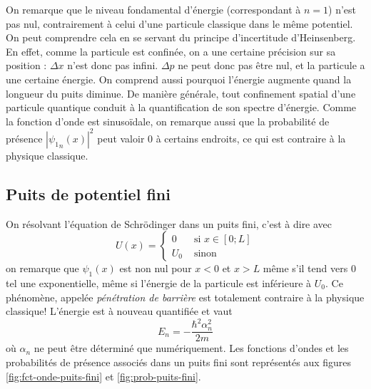 \begin{myrem}
	On remarque que le niveau fondamental d'énergie (correspondant
	à $n=1$) n'est pas nul, contrairement à celui d'une particule
	classique dans le même potentiel. On peut comprendre cela en
	se servant du principe d'incertitude d'Heinsenberg. En effet,
	comme la particule est confinée, on a une certaine précision
	sur sa position : $\Delta x$ n'est donc pas infini. $\Delta p$
	ne peut donc pas être nul, et la particule a une certaine énergie.
	On comprend aussi pourquoi l'énergie augmente quand la longueur
	du puits diminue. De manière générale, tout confinement
	spatial d'une particule quantique conduit à la quantification
	de son spectre d'énergie.
	Comme la fonction d'onde est sinusoïdale, on remarque aussi
	que la probabilité de présence $|{\psi_1}_n(x)|^2$ peut valoir
	0 à certains endroits, ce qui est contraire à la physique
	classique.
\end{myrem}

\subsection{Puits de potentiel fini}
On résolvant l'équation de Schrödinger dans un puits
fini, c'est à dire avec
\[ U(x) = \left\{
  \begin{aligned}
    0 & \text{ si } x \in [0; L]\\
    U_0 & \text{ sinon}
  \end{aligned}
\right. \]
on remarque que $\psi_1(x)$ est non nul pour $x < 0$ et $x > L$
même s'il tend vers 0 tel une exponentielle, même si l'énergie de
la particule est inférieure à $U_0$. Ce phénomène,
appelée \emph{pénétration de barrière} est totalement
contraire à la physique classique!
L'énergie est à nouveau quantifiée et vaut
\[
  E_n = -\frac{\hbar^2\alpha_n^2}{2m}
\]
où $\alpha_n$ ne peut être déterminé que numériquement.
Les fonctions d'ondes et les probabilités de présence
associés dans un puits fini sont représentés aux figures
\ref{fig:fct-onde-puits-fini} et \ref{fig:prob-puits-fini}.

